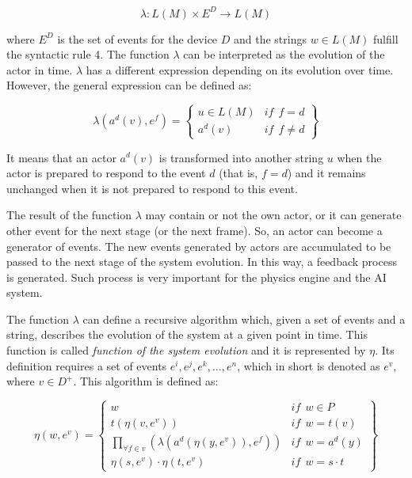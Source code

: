 \documentclass[10pt,journal,letterpaper,compsoc]{IEEEtran}
\begin{document}
\begin{equation}
    \lambda: L(M) \times E^D \rightarrow L(M)
\end{equation}

where $E^D$ is the set of events for the device $D$ and the strings $w \in L(M)$ fulfill the
syntactic rule 4. The function $\lambda$ can be interpreted as the evolution of the actor in time.
$\lambda$ has a different expression depending on its evolution over time. However, the
general expression can be defined as:


\begin{equation}
    \lambda (a^{d}(v),e^{f})=
    \left\{
    \begin{array}{ll}
        u \in L(M) & \mathit{if}  \ \ f = d \\
        a^{d}(v)  & \mathit{if}  \ \ f \neq d
    \end{array}\right\}
\end{equation}


It means that an actor $a^{d}(v)$ is transformed into another string $u$ when the actor is prepared
to respond to the event $d$ (that is, $f=d$) and it remains unchanged when it is not
prepared to respond to this event.


The result of the function $\lambda$ may contain or not the own actor, or it can generate other
event for the next stage (or the next frame). So, an actor can become a generator of events. The
new events generated by actors are accumulated to be passed to the next stage of the system
evolution. In this way, a feedback process is generated. Such process is very important for the
physics engine and the AI system.

The function $\lambda$ can define a recursive algorithm which, given a set of
events and a string, describes the evolution of the system at a given point
in time. This function is called \textit{function of the system evolution} and
it is represented by $\eta$. Its definition requires a set of events
$e^i, e^j, e^k, \dots, e^n$, which in short is denoted as $e^v$, where $v
\in D^+$. This algorithm is defined as:


\begin{equation}
    \eta (w, e^v) = \left\{
    \begin{array}{ll}
        w   & \mathit{if}  \ \ w \in P  \\

        t(\eta (v, e^v))    & \mathit{if}  \ \  w = t(v)  \\

        \underset{\forall f \in v}{ \prod }(\lambda (a^d (\eta
            (y, e^v)), e^f))    & \mathit{if}  \ \ w = a^d(y)
\\

        \eta (s, e^v) \cdot \eta (t, e^v)   & \mathit{if}  \
\  w = s \cdot t
    \end{array}\right\}
\end{equation}
\end{document}

